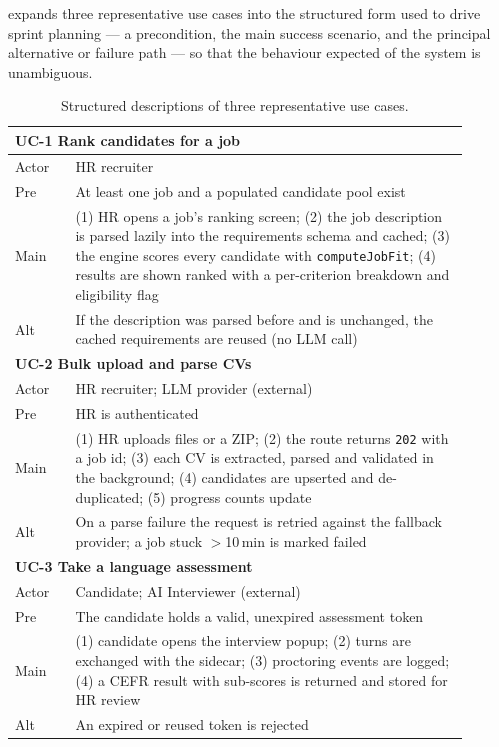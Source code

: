  expands three representative use cases into the
structured form used to drive sprint planning --- a precondition, the main
success scenario, and the principal alternative or failure path --- so that
the behaviour expected of the system is unambiguous.

\begin{table}[ht]
\centering
\caption[Selected use-case descriptions]{Structured descriptions of three
representative use cases.}
\label{tab:usecase-detail}
\small
\setlength{\tabcolsep}{4pt}
\begin{tabular}{p{0.12\linewidth}p{0.78\linewidth}}
\toprule
\multicolumn{2}{l}{\textbf{UC-1 Rank candidates for a job}} \\
\midrule
Actor & HR recruiter \\
Pre & At least one job and a populated candidate pool exist \\
Main & (1) HR opens a job's ranking screen; (2) the job description is parsed lazily into the requirements schema and cached; (3) the engine scores every candidate with \texttt{computeJobFit}; (4) results are shown ranked with a per-criterion breakdown and eligibility flag \\
Alt & If the description was parsed before and is unchanged, the cached requirements are reused (no LLM call) \\
\midrule
\multicolumn{2}{l}{\textbf{UC-2 Bulk upload and parse CVs}} \\
\midrule
Actor & HR recruiter; LLM provider (external) \\
Pre & HR is authenticated \\
Main & (1) HR uploads files or a ZIP; (2) the route returns \texttt{202} with a job id; (3) each CV is extracted, parsed and validated in the background; (4) candidates are upserted and de-duplicated; (5) progress counts update \\
Alt & On a parse failure the request is retried against the fallback provider; a job stuck $>$10\,min is marked failed \\
\midrule
\multicolumn{2}{l}{\textbf{UC-3 Take a language assessment}} \\
\midrule
Actor & Candidate; AI Interviewer (external) \\
Pre & The candidate holds a valid, unexpired assessment token \\
Main & (1) candidate opens the interview popup; (2) turns are exchanged with the sidecar; (3) proctoring events are logged; (4) a CEFR result with sub-scores is returned and stored for HR review \\
Alt & An expired or reused token is rejected \\
\bottomrule
\end{tabular}
\end{table}

